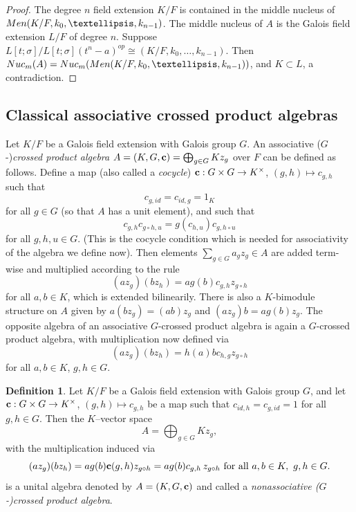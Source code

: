 \documentclass[11pt]{amsart}
\theoremstyle{plain}
\theoremstyle{definition}
\newtheorem{definition}[theorem]{Definition}
\newcommand{\ignore}[1]{}
\begin{document}
\begin{proof}
The degree $n$ field extension $K/F$ is contained in the middle nucleus of ${\rm Men}(K/F,k_0,\dots, k_{n-1})$. The middle nucleus of  $A$ is the Galois field extension $L/F$ of degree $n$. Suppose $L[t;\sigma]/L[t;\sigma](t^n-a)^{op}\cong
  (K/F, k_0,\dots,k_{n-1})$. Then ${\rm Nuc}_m(A)={\rm Nuc}_m({\rm Men}(K/F,k_0,\dots, k_{n-1}))$, and $K\subset L$, a contradiction.
\end{proof}

\subsection{Classical associative crossed product algebras}

Let $K/F$ be a Galois field extension with Galois group $G$. An associative ($G$-)\emph{crossed product algebra} $A=(K,G,{\bf c})=\bigoplus_{g\in G}Kz_g$ over $F$ can be defined as follows. Define a map (also called a \emph{cocycle}) ${\bf c}:G\times G\to K^\times$, $(g,h)\mapsto c_{g,h}$ such that
$$c_{g,id}=c_{id,g}=1_K$$
 for all $g\in G$ (so that  $A$ has a unit element), and such that
$$c_{g,h}c_{g\circ h,u}=g(c_{h,u})c_{g,h\circ u}$$
for all $g,h,u\in G$.
(This is the cocycle condition which is needed for associativity of the algebra we define now).
 Then elements $\sum_{g\in G} a_gz_g\in A$ are added term-wise and multiplied according to the rule
$$(az_g)(b z_h)=a g(b) c_{g,h} z_{g\circ h}$$
for all $a, b\in K$,
which is extended bilinearily. There is also a $K$-bimodule structure on $A$ given by $a(b z_g)= (ab)z_g$ and $(a z_g) b=a g(b) z_g$.
The opposite algebra of an associative $G$-crossed product algebra is again a $G$-crossed product algebra,
with multiplication now defined via
$$(az_g)(b z_h)=h(a) b c_{h,g} z_{g\circ h}$$
for all $a, b\in K$, $g,h\in G$.

\ignore{say $G$ is abelian, then
$z_gz_h= c_{g,h}z_{gh}= c_{g,h}z_{hg}$ and $z_h z_g=c_{h,g} z_{hg}$. If $c_{g,h}=c_{h,g}$ then we get
$$z_gz_h= c_{g,h}z_{gh}= c_{h,g}z_{hg}=z_h z_g.$$
}

\begin{definition}
Let $K/F $ be a Galois field extension with  Galois group $G$,
and let ${\bf c} : G \times G \to K^{\times}$, $(g,h)\mapsto c_{g,h}$ be a map such that $c_{id,h}=c_{g,id}=1$ for all $g,h\in G$.
Then the $K$–vector space
\[
A = \bigoplus_{g \in G} K z_{g},
\]
with the multiplication induced via
\[
(a z_g)(b z_h) = a g(b) {\bf c}(g,h) z_{g\circ h}= a g(b) c_{g,h}\, z_{g\circ h}\text{ for all }
 a,b \in K,\ g,h \in G.
\]
is a unital algebra denoted by  $A = (K, G,  {\bf c})$ and  called a  \emph{nonassociative ($G$-)crossed product algebra}.
\end{definition}
\end{document}

